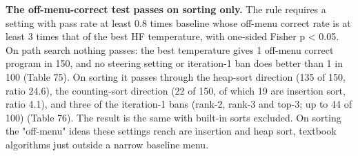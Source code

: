 \documentclass[11pt,letterpaper]{article}
\begin{document}
\endgroup
\textbf{The off-menu-correct test passes on sorting only.} The rule requires a setting with pass rate at least 0.8 times baseline whose off-menu correct rate is at least 3 times that of the best HF temperature, with one-sided Fisher p \textless{} 0.05. On path search nothing passes: the best temperature gives 1 off-menu correct program in 150, and no steering setting or iteration-1 ban does better than 1 in 100 (Table 75). On sorting it passes through the heap-sort direction (135 of 150, ratio 24.6), the counting-sort direction (22 of 150, of which 19 are insertion sort, ratio 4.1), and three of the iteration-1 bans (rank-2, rank-3 and top-3; up to 44 of 100) (Table 76). The result is the same with built-in sorts excluded. On sorting the "off-menu" ideas these settings reach are insertion and heap sort, textbook algorithms just outside a narrow baseline menu.
\end{document}
